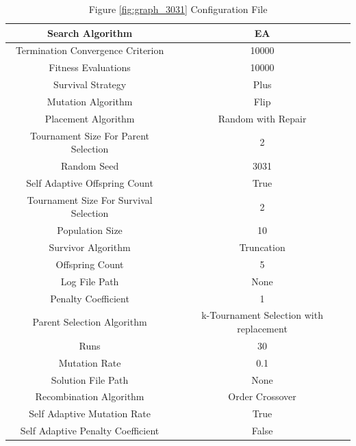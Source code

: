 \documentclass{standalone}
\begin{document}
\clearpage
\begin{table}[!htb]
	\centering
	\caption{Figure \ref{fig:graph_3031} Configuration File}
	\label{tab:graph_3031}
	\begin{tabular}{| c | c |}
		\hline
		Search Algorithm		& EA		 \\
		\hline
		Termination Convergence Criterion		& 10000		 \\
		\hline
		Fitness Evaluations		& 10000		 \\
		\hline
		Survival Strategy		& Plus		 \\
		\hline
		Mutation Algorithm		& Flip		 \\
		\hline
		Placement Algorithm		& Random with Repair		 \\
		\hline
		Tournament Size For Parent Selection		& 2		 \\
		\hline
		Random Seed		& 3031		 \\
		\hline
		Self Adaptive Offspring Count		& True		 \\
		\hline
		Tournament Size For Survival Selection		& 2		 \\
		\hline
		Population Size		& 10		 \\
		\hline
		Survivor Algorithm		& Truncation		 \\
		\hline
		Offspring Count		& 5		 \\
		\hline
		Log File Path		& None		 \\
		\hline
		Penalty Coefficient		& 1		 \\
		\hline
		Parent Selection Algorithm		& k-Tournament Selection with replacement		 \\
		\hline
		Runs		& 30		 \\
		\hline
		Mutation Rate		& 0.1		 \\
		\hline
		Solution File Path		& None		 \\
		\hline
		Recombination Algorithm		& Order Crossover		 \\
		\hline
		Self Adaptive Mutation Rate		& True		 \\
		\hline
		Self Adaptive Penalty Coefficient		& False		 \\
		\hline
	\end{tabular}
\end{table}
\end{document}
